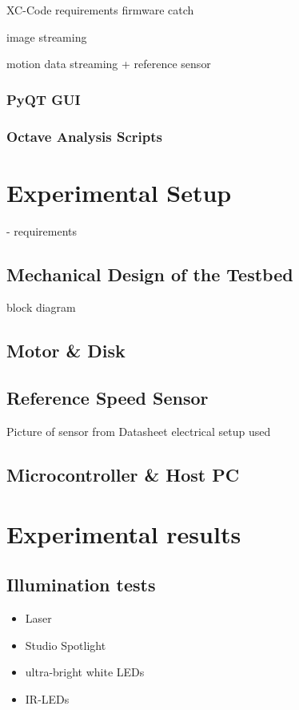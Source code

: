 \documentclass[12pt,a4paper]{article}
\begin{document}
  XC-Code
    requirements
    firmware catch

    image streaming

    motion data streaming
      + reference sensor

\subsubsection{PyQT GUI}

\subsubsection{Octave Analysis Scripts}

\section{Experimental Setup}

- requirements

\subsection{Mechanical Design of the Testbed}

block diagram

\subsection{Motor \& Disk}

\subsection{Reference Speed Sensor}
      Picture of sensor from Datasheet
      electrical setup used

\subsection{Microcontroller \& Host PC}      

\section{Experimental results}

\subsection{Illumination tests}

\begin{itemize}
  \item Laser
  \item Studio Spotlight
  \item ultra-bright white LEDs
  \item IR-LEDs
\end{itemize}
\end{document}
